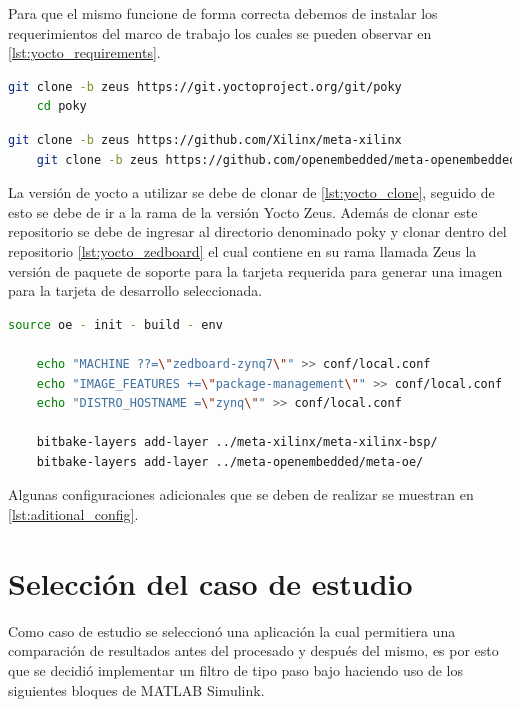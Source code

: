 Para que el mismo funcione de forma correcta debemos de instalar los requerimientos del marco de trabajo los cuales se pueden observar en \ref{lst:yocto_requirements}.

\begin{lstlisting}[language=bash, caption={Version de Yocto}, label=lst:yocto_clone]
    git clone -b zeus https://git.yoctoproject.org/git/poky
    cd poky
\end{lstlisting}

\begin{lstlisting}[language=bash, caption={BSP para Zedboard}, label=lst:yocto_zedboard]
    git clone -b zeus https://github.com/Xilinx/meta-xilinx
    git clone -b zeus https://github.com/openembedded/meta-openembedded.git
\end{lstlisting}

La versión de yocto a utilizar se debe de clonar de \ref{lst:yocto_clone}, seguido de esto se debe de ir a la rama de la versión Yocto Zeus. Además de clonar este repositorio se debe de ingresar al directorio denominado poky y clonar dentro del repositorio \ref{lst:yocto_zedboard} el cual contiene en su rama llamada Zeus la versión de paquete de soporte para la tarjeta requerida para generar una imagen para la tarjeta de desarrollo seleccionada.

\begin{lstlisting}[language=bash, caption={Configuraciones adicionales, Yocto}, label=lst:aditional_config]
    source oe - init - build - env
    
    echo "MACHINE ??=\"zedboard-zynq7\"" >> conf/local.conf
    echo "IMAGE_FEATURES +=\"package-management\"" >> conf/local.conf
    echo "DISTRO_HOSTNAME =\"zynq\"" >> conf/local.conf
    
    bitbake-layers add-layer ../meta-xilinx/meta-xilinx-bsp/
    bitbake-layers add-layer ../meta-openembedded/meta-oe/
\end{lstlisting}

Algunas configuraciones adicionales que se deben de realizar se muestran en \ref{lst:aditional_config}.


\section{Selección del caso de estudio}

Como caso de estudio se seleccionó una aplicación la cual permitiera una comparación de resultados antes del procesado y después del mismo, es por esto que se decidió implementar un filtro  de tipo paso bajo haciendo uso de los siguientes bloques de MATLAB Simulink. 

